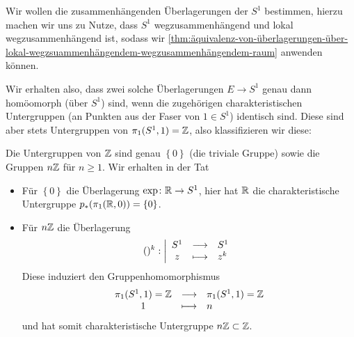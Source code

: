 \begin{example}\label{ex:zusammenhängende-überlagerungen-der-s1}
    Wir wollen die zusammenhängenden Überlagerungen der $S^1$ bestimmen, hierzu machen wir uns zu Nutze, dass $S^1$ wegzusammenhängend und lokal wegzusammenhängend ist, sodass wir  \autoref{thm:äquivalenz-von-überlagerungen-über-lokal-wegzsuammenhängendem-wegzusammenhängendem-raum} anwenden können.

    Wir erhalten also, dass zwei solche Überlagerungen $E\to S^1$ genau dann homöomorph (über $S^1$) sind, wenn die zugehörigen charakteristischen Untergruppen (an Punkten aus der Faser von $1\in S^1$) identisch sind. Diese sind aber stets Untergruppen von $\pi_1(S^1,1) = \mathbb{Z}$, also klassifizieren wir diese:

    Die Untergruppen von $\mathbb{Z}$ sind genau $\left \{0\right\} $ (die triviale Gruppe) sowie die Gruppen $n\mathbb{Z}$ für $n\geq 1$. Wir erhalten in der Tat
    \begin{itemize}
        \item Für $\left \{0\right\} $ die Überlagerung $\exp \colon  \mathbb{R} \to  S^1$, hier hat $\mathbb{R}$ die charakteristische Untergruppe $p_*(\pi_1(\mathbb{R},0)) = \left \{0\right\} $.
        \item Für $n\mathbb{Z}$ die Überlagerung
                \begin{equation*}
                    ()^k : \left| \begin{array}{c c l} 
                S^1 & \longrightarrow & S^1 \\
                z & \longmapsto &  z^k
                \end{array} \right.
            \end{equation*}
        Diese induziert den Gruppenhomomorphismus
            \begin{equation*}
            \begin{array}{c c l} 
                \pi_1(S^1,1) = \mathbb{Z} & \longrightarrow & \pi_1(S^1,1) = \mathbb{Z} \\
            1 & \longmapsto &  n
            \end{array}
        \end{equation*}
        und hat somit charakteristische Untergruppe $n\mathbb{Z}\subset \mathbb{Z}$.


\end{itemize}
\end{example}
